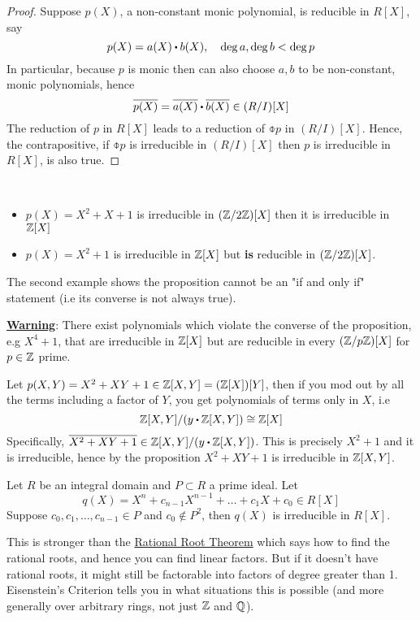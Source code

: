 \documentclass[../Main.tex]{subfiles}
\begin{document}
\begin{proof}
	Suppose $p(X)$, a non-constant monic polynomial, is reducible in $R[X]$, say
	\[p(X)=a(X)\rdot b(X),\quad \deg a, \deg b< \deg p\]
	In particular, because $p$ is monic then can also choose $a,b$ to be non-constant, monic polynomials, hence
	\[\obar{p(X)} = \obar{a(X)}\rdot \obar{b(X)} \in (R/I)[X]\]
	The reduction of $p$ in $R[X]$ leads to a reduction of $\obar{p}$ in $(R/I)[X]$. Hence, the contrapositive, if $\obar{p}$ is irreducible in $(R/I)[X]$ then $p$ is irreducible in $R[X]$, is also true.
\end{proof}
\begin{example}~
	\begin{itemize}
		\item $p(X)=X^2+X+1$ is irreducible in $(\mathbb{Z}/2\mathbb{Z})[X]$ then it is irreducible in $\mathbb{Z}[X]$
		\item $p(X)=X^2+1$ is irreducible in $\mathbb{Z}[X]$ but \textbf{is} reducible in $(\mathbb{Z}/2\mathbb{Z})[X]$.
	\end{itemize}
	The second example shows the proposition cannot be an "if and only if" statement (i.e its converse is not always true).
\end{example}
\textbf{\textcolor{BrickRed}{\underline{Warning}}}: There exist polynomials which violate the converse of the proposition, e.g $X^4+1$, that are irreducible in $\mathbb{Z}[X]$ but are reducible in every $(\mathbb{Z}/p\mathbb{Z})[X]$ for $p\in \mathbb{Z} $ prime.
\begin{example}
	Let $p(X,Y) = X^2+XY+1\in \mathbb{Z}[X,Y] = (\mathbb{Z}[X])[Y]$, then if you mod out by all the terms including a factor of $Y$, you get polynomials of terms only in $X$, i.e
	\[\Z[X,Y]/(y\rdot \Z[X,Y]) \cong \Z[X]\]
	Specifically, $\obar{X^2+XY+1} \in \Z[X,Y]/(y\rdot \Z[X,Y])$. This is precisely $X^2+1$ and it is irreducible, hence by the proposition $X^2+XY+1$ is irreducible in $\mathbb{Z}[X,Y]$.
\end{example}
\newpage
\begin{thm}[title= Eisenstein's Criterion,label=eisen]
	Let $R$ be an integral domain and $P\subset R$ a prime ideal. Let
	\[q(X)=X^n+c_{n-1}X^{n-1}+\dots+c_1X+c_0\in R[X]\]
	Suppose $c_0,c_1,\dots,c_{n-1}\in P$ and $c_0\notin P^2$, then $q(X)$ is irreducible in $R[X]$.
\end{thm}
This is stronger than the \hyperref[prop:rational]{Rational Root Theorem} which says how to find the rational roots, and hence you can find linear factors. But if it doesn't have rational roots, it might still be factorable into factors of degree greater than 1. Eisenstein's Criterion tells you in what situations this is possible (and more generally over arbitrary rings, not just $\mathbb{Z}$ and $\mathbb{Q}$).
\end{document}

